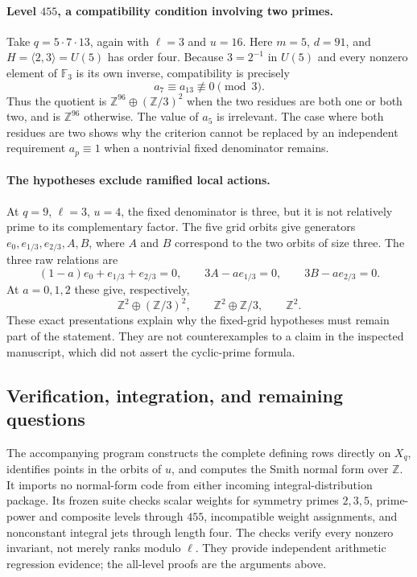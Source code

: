 \documentclass[11pt,a4paper]{article}
\numberwithin{equation}{section}
\theoremstyle{definition}
\theoremstyle{remark}
\begin{document}
\paragraph{Level $455$, a compatibility condition involving two primes.}
Take $q=5\cdot7\cdot13$, again with $\ell=3$ and $u=16$.
Here $m=5$, $d=91$, and
$H=\langle2,3\rangle=U(5)$ has order four.
Because $3=2^{-1}$ in $U(5)$ and every nonzero element of
$\mathbb F_3$ is its own inverse, compatibility is precisely
\[
 a_7\equiv a_{13}\not\equiv0\pmod3.
\]
Thus the quotient is
$\mathbb Z^{96}\oplus(\mathbb Z/3)^2$ when the two residues
are both one or both two, and is $\mathbb Z^{96}$ otherwise.
The value of $a_5$ is irrelevant. The case where both residues are
two shows why the criterion cannot be replaced by an independent
requirement $a_p\equiv1$ when a nontrivial fixed denominator remains.

\paragraph{The hypotheses exclude ramified local actions.}
At $q=9$, $\ell=3$, $u=4$, the fixed denominator is three, but it
is not relatively prime to its complementary factor. The five grid
orbits give generators $e_0,e_{1/3},e_{2/3},A,B$, where $A$ and
$B$ correspond to the two orbits of size three. The three raw
relations are
\[
 (1-a)e_0+e_{1/3}+e_{2/3}=0,\qquad
 3A-ae_{1/3}=0,\qquad 3B-ae_{2/3}=0.
\]
At $a=0,1,2$ these give, respectively,
\[
 \mathbb Z^2\oplus(\mathbb Z/3)^2,\qquad
 \mathbb Z^2\oplus\mathbb Z/3,\qquad
 \mathbb Z^2.
\]
These exact presentations explain why the fixed-grid hypotheses
must remain part of the statement. They are not counterexamples
to a claim in the inspected manuscript, which did not assert the
cyclic-prime formula.

\subsection{Verification, integration, and remaining questions}

The accompanying program constructs the complete defining rows
directly on $X_q$, identifies points in the orbits of $u$, and
computes the Smith normal form over $\mathbb Z$. It imports no
normal-form code from either incoming integral-distribution package.
Its frozen suite checks scalar weights for symmetry primes
$2,3,5$, prime-power and composite levels through $455$, incompatible
weight assignments, and nonconstant integral jets through length
four. The checks verify every nonzero invariant, not merely ranks
modulo $\ell$. They provide independent arithmetic regression
evidence; the all-level proofs are the arguments above.
\end{document}
